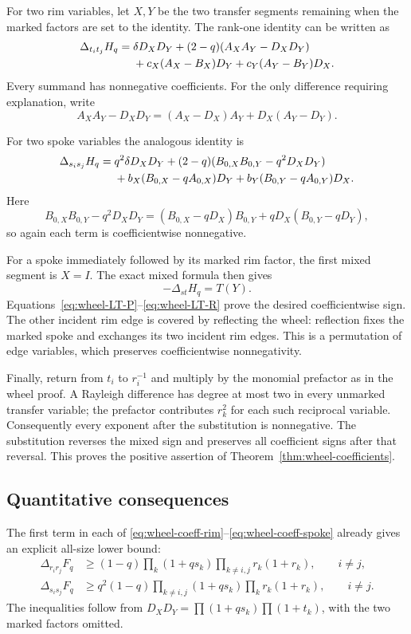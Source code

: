 \documentclass[11pt,a4paper]{article}
\theoremstyle{definition}
\theoremstyle{remark}\newtheorem{remark}[theorem]{Remark}
\begin{document}
For two rim variables, let $X,Y$ be the two transfer segments remaining
when the marked factors are set to the identity. The rank-one identity
can be written as
\begin{align}
 \Delta_{t_i t_j}H_q={}&
 \delta D_XD_Y
 +(2-q)(A_XA_Y-D_XD_Y)\notag\\
 &+c_X(A_X-B_X)D_Y+c_Y(A_Y-B_Y)D_X.
 \label{eq:wheel-coeff-rim}
\end{align}
Every summand has nonnegative coefficients. For the only difference
requiring explanation, write
\[
 A_XA_Y-D_XD_Y
 =(A_X-D_X)A_Y+D_X(A_Y-D_Y).
\]

For two spoke variables the analogous identity is
\begin{align}
 \Delta_{s_i s_j}H_q={}&
 q^2\delta D_XD_Y
 +(2-q)(B_{0,X}B_{0,Y}-q^2D_XD_Y)\notag\\
 &+b_X(B_{0,X}-qA_{0,X})D_Y
  +b_Y(B_{0,Y}-qA_{0,Y})D_X.
 \label{eq:wheel-coeff-spoke}
\end{align}
Here
\[
 B_{0,X}B_{0,Y}-q^2D_XD_Y
 =(B_{0,X}-qD_X)B_{0,Y}
   +qD_X(B_{0,Y}-qD_Y),
\]
so again each term is coefficientwise nonnegative.

For a spoke immediately followed by its marked rim factor,
the first mixed segment is $X=I$. The exact mixed formula then gives
\[
 -\Delta_{st}H_q=T(Y).
\]
Equations~\eqref{eq:wheel-LT-P}--\eqref{eq:wheel-LT-R} prove the
desired coefficientwise sign. The other incident rim edge is covered
by reflecting the wheel: reflection fixes the marked spoke and exchanges
its two incident rim edges. This is a permutation of edge variables,
which preserves coefficientwise nonnegativity.

Finally, return from $t_i$ to $r_i^{-1}$ and multiply by the monomial
prefactor as in the wheel proof. A Rayleigh difference has degree at
most two in every unmarked transfer variable; the prefactor contributes
$r_k^2$ for each such reciprocal variable. Consequently every exponent
after the substitution is nonnegative. The substitution reverses the
mixed sign and preserves all coefficient signs after that reversal.
This proves the positive assertion of
Theorem~\ref{thm:wheel-coefficients}.

\subsection{Quantitative consequences}

The first term in each of
\eqref{eq:wheel-coeff-rim}--\eqref{eq:wheel-coeff-spoke} already gives
an explicit all-size lower bound:
\begin{align}
 \Delta_{r_i r_j}F_q
 &\ge (1-q)
   \prod_k(1+qs_k)\prod_{k\ne i,j}r_k(1+r_k),
   \qquad i\ne j,\label{eq:wheel-lower-rim}\\
 \Delta_{s_i s_j}F_q
 &\ge q^2(1-q)
   \prod_{k\ne i,j}(1+qs_k)\prod_k r_k(1+r_k),
   \qquad i\ne j.\label{eq:wheel-lower-spoke}
\end{align}
The inequalities follow from
$D_XD_Y=\prod(1+qs_k)\prod(1+t_k)$, with the two marked
factors omitted.
\end{document}
